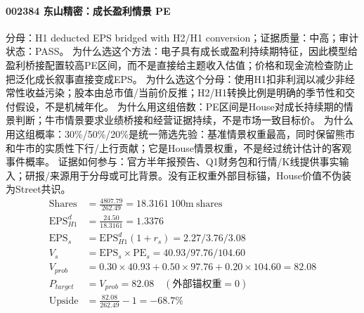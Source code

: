 \paragraph{002384 东山精密：成长盈利情景 PE}
分母：H1 deducted EPS bridged with H2/H1 conversion；证据质量：中高；审计状态：PASS。
为什么选这个方法：电子具有成长或盈利持续期特征，因此模型给盈利桥接配置较高PE区间，而不是直接给主题收入估值；价格和现金流检查防止把泛化成长叙事直接变成EPS。
为什么选这个分母：使用H1扣非利润以减少非经常性收益污染；股本由总市值/当前价反推；H2/H1转换比例是明确的季节性和交付假设，不是机械年化。
为什么用这组倍数：PE区间是House对成长持续期的情景判断；牛市情景要求业绩桥接和经营证据持续，不是市场一致目标价。
为什么用这组概率：30\%/50\%/20\%是统一筛选先验：基准情景权重最高，同时保留熊市和牛市的实质性下行/上行贡献；它是House情景权重，不是经过统计估计的客观事件概率。
证据如何参与：官方半年报预告、Q1财务包和行情/K线提供事实输入；研报/来源用于分母或可比背景。没有正权重外部目标锚，House价值不伪装为Street共识。
\begin{align*}
\mathrm{Shares} &= \frac{4807.79}{262.49}=18.3161\ \mathrm{100m\ shares}\\
\mathrm{EPS}_{H1}^d &= \frac{24.50}{18.3161}=1.3376\\
\mathrm{EPS}_s &= \mathrm{EPS}_{H1}^d(1+r_s)=2.27/3.76/3.08\\
V_s &= \mathrm{EPS}_s\times \mathrm{PE}_s=40.93/97.76/104.60\\
V_{prob} &= 0.30\times 40.93+0.50\times 97.76+0.20\times 104.60=82.08\\
P_{target} &= V_{prob}=82.08\quad(\text{外部锚权重}=0)\\
\mathrm{Upside} &= \frac{82.08}{262.49}-1=-68.7\%\\
\end{align*}

